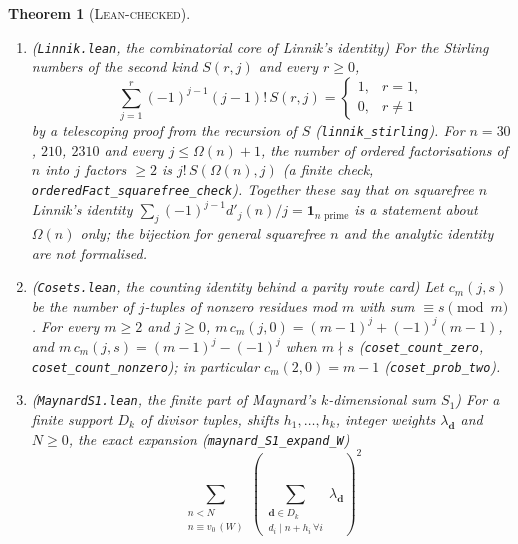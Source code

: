 \documentclass[11pt]{amsart}
\newtheorem{theorem}{Theorem}
\theoremstyle{definition}
\theoremstyle{remark}
\newcommand{\lbl}[1]{\textup{\textsc{#1}}}
\begin{document}
\begin{theorem}[\lbl{Lean-checked}]
\begin{enumerate}
\texttt{SelbergOpt.lean}): $\sum_{d,e\le D}\lambda_d\lambda_e/[d,e]\ge\lambda_1^2/G(D)$ with
$G(D)=\sum_{r\le D}\mu^2(r)/\varphi(r)$, from \texttt{selberg\_diag}, the identity
$\sum_{r\le D}\mu(r)y_r=\lambda_1$ and a weighted Cauchy--Schwarz inequality. Here $\mu$ is
defined without factorisation, by $\mu(1)=1$ and $\sum_{r\mid n}\mu(r)=0$ for $n\ge2$
(\texttt{mu\_divisor\_sum}). The bound is attained for every $D\ge1$
(\texttt{selberg\_lower\_attained} in \texttt{SelbergEq.lean}): with $W=\operatorname{lcm}(\varphi(1),\dots,\varphi(D))$,
$y_r=\mu(r)W/\varphi(r)$, $t_d=y_d-\sum_{d<e\le D,\ d\mid e}t_e$ and $\lambda_d=d\,t_d$ one has $\lambda_1=G(D)W>0$ and
equality; at $D=6$ these are the weights $(13,-12,-12,0,-5,12)$ above. Uniqueness of the extremal weights is formalised
only at $D=6$.
\item (\texttt{Linnik.lean}, the combinatorial core of Linnik's identity) For
the Stirling numbers of the second kind $S(r,j)$ and \emph{every} $r\ge0$,
\[
\sum_{j=1}^{r}(-1)^{j-1}(j-1)!\,S(r,j)=\begin{cases}1,&r=1,\\0,&r\ne1\end{cases}
\]
by a telescoping proof from the recursion of $S$
(\texttt{linnik\_stirling}). For $n=30$, $210$, $2310$ and every
$j\le\Omega(n)+1$, the number of ordered factorisations of $n$ into $j$ factors
$\ge2$ is $j!\,S(\Omega(n),j)$ (a finite check,
\texttt{orderedFact\_squarefree\_check}). Together these say that on squarefree
$n$ Linnik's identity $\sum_j(-1)^{j-1}d'_j(n)/j=\mathbf 1_{n\text{ prime}}$ is a
statement about $\Omega(n)$ only; the bijection for general squarefree $n$
and the analytic identity are not formalised.
\item (\texttt{Cosets.lean}, the counting identity behind a parity route card) Let $c_m(j,s)$ be the number of
$j$-tuples of nonzero residues mod $m$ with sum $\equiv s\pmod m$. For every $m\ge2$ and $j\ge0$,
$m\,c_m(j,0)=(m-1)^j+(-1)^j(m-1)$, and $m\,c_m(j,s)=(m-1)^j-(-1)^j$ when $m\nmid s$
(\texttt{coset\_count\_zero}, \texttt{coset\_count\_nonzero}); in particular $c_m(2,0)=m-1$
(\texttt{coset\_prob\_two}).
\item (\texttt{MaynardS1.lean}, the finite part of Maynard's $k$-dimensional sum $S_1$) For a finite
support $D_k$ of divisor tuples, shifts $h_1,\dots,h_k$, integer weights $\lambda_{\mathbf d}$ and
$N\ge0$, the exact expansion (\texttt{maynard\_S1\_expand\_W})
\[
\sum_{\substack{n<N\\ n\equiv v_0\,(W)}}\left(\sum_{\substack{\mathbf d\in D_k\\ d_i\mid n+h_i\,\forall i}}\lambda_{\mathbf d}\right)^2
\]
\end{enumerate}
\end{theorem}
\end{document}
